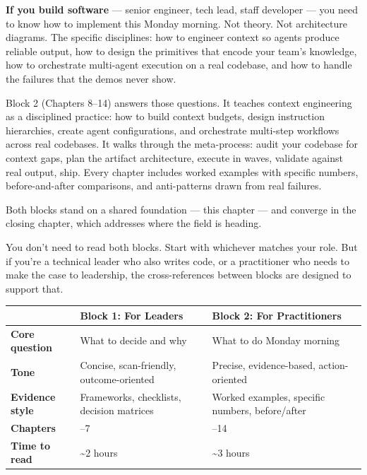 \documentclass[
  a4paper,
  DIV=11,
  numbers=noendperiod]{scrreprt}
\newcounter{none} %
\begin{document}
\textbf{If you build software} --- senior engineer, tech lead, staff
developer --- you need to know how to implement this Monday morning. Not
theory. Not architecture diagrams. The specific disciplines: how to
engineer context so agents produce reliable output, how to design the
primitives that encode your team's knowledge, how to orchestrate
multi-agent execution on a real codebase, and how to handle the failures
that the demos never show.

Block 2 (Chapters 8--14) answers those questions. It teaches context
engineering as a disciplined practice: how to build context budgets,
design instruction hierarchies, create agent configurations, and
orchestrate multi-step workflows across real codebases. It walks through
the meta-process: audit your codebase for context gaps, plan the
artifact architecture, execute in waves, validate against real output,
ship. Every chapter includes worked examples with specific numbers,
before-and-after comparisons, and anti-patterns drawn from real
failures.

Both blocks stand on a shared foundation --- this chapter --- and
converge in the closing chapter, which addresses where the field is
heading.

You don't need to read both blocks. Start with whichever matches your
role. But if you're a technical leader who also writes code, or a
practitioner who needs to make the case to leadership, the
cross-references between blocks are designed to support that.

{\def\LTcaptype{none} %
\begin{longtable}[]{@{}
  >{\raggedright\arraybackslash}p{}
  >{\raggedright\arraybackslash}p{}
  >{\raggedright\arraybackslash}p{}@{}}
\toprule\noalign{}
\begin{minipage}[b]{\linewidth}\raggedright
\end{minipage} & \begin{minipage}[b]{\linewidth}\raggedright
Block 1: For Leaders
\end{minipage} & \begin{minipage}[b]{\linewidth}\raggedright
Block 2: For Practitioners
\end{minipage} \\
\midrule\noalign{}
\endhead
\bottomrule\noalign{}
\endlastfoot
\textbf{Core question} & What to decide and why & What to do Monday
morning \\
\textbf{Tone} & Concise, scan-friendly, outcome-oriented & Precise,
evidence-based, action-oriented \\
\textbf{Evidence style} & Frameworks, checklists, decision matrices &
Worked examples, specific numbers, before/after \\
\textbf{Chapters} & 2--7 & 8--14 \\
\textbf{Time to read} & \textasciitilde2 hours & \textasciitilde3
hours \\
\end{longtable}
}
\end{document}
